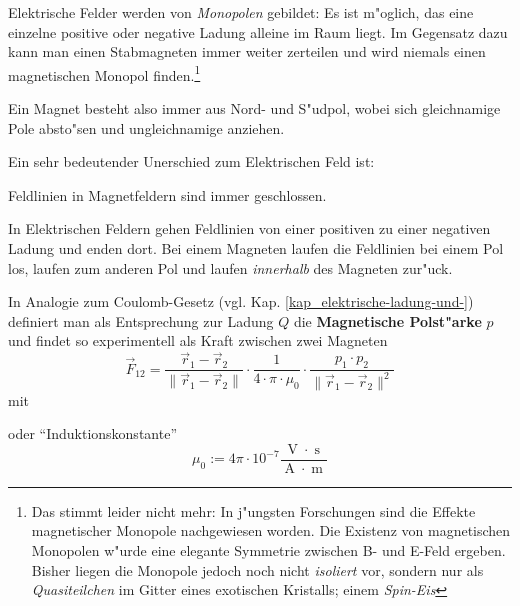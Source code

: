 Elektrische Felder werden von \emph{Monopolen} gebildet: Es ist
m"oglich, das eine einzelne positive oder negative Ladung alleine im
Raum liegt. Im Gegensatz dazu kann man einen Stabmagneten immer weiter
zerteilen und wird niemals einen magnetischen Monopol finden.\footnote{Das stimmt leider
  nicht mehr: In j"ungsten Forschungen sind die Effekte magnetischer
  Monopole nachgewiesen worden. Die Existenz von magnetischen
  Monopolen w"urde eine elegante Symmetrie zwischen B- und E-Feld
  ergeben. Bisher liegen die Monopole jedoch noch nicht
  \emph{isoliert} vor, sondern nur als \emph{Quasiteilchen} im Gitter
  eines exotischen Kristalls; einem \emph{Spin-Eis}}
\begin{Wichtig}
   Ein Magnet besteht also immer aus Nord- und S"udpol, wobei sich
   gleichnamige Pole absto"sen und ungleichnamige anziehen.
\end{Wichtig}

Ein sehr bedeutender Unerschied zum Elektrischen Feld ist:
\begin{Wichtig}
   Feldlinien in Magnetfeldern sind immer geschlossen.
\end{Wichtig}
In Elektrischen Feldern gehen Feldlinien von einer positiven zu einer
negativen Ladung und enden dort. Bei einem Magneten laufen die
Feldlinien bei einem Pol los, laufen zum anderen Pol und laufen
\emph{innerhalb} des Magneten zur"uck.

\bigskip

In Analogie
zum Coulomb-Gesetz (vgl. Kap. \ref{kap_elektrische-ladung-und-})
definiert man als Entsprechung zur Ladung $Q$ die
\textbf{Magnetische Polst"arke} $p$ und
findet so experimentell als Kraft zwischen zwei Magneten
\begin{equation}
   \label{eqn_differenz-c88}
   \vec F_{12} = \frac{\vec r_1  - \vec r_2}{\|\vec r_1 - \vec r_2\|} \cdot
   \frac{1}{4 \cdot \pi \cdot \mu_0} \cdot \frac{p_1 \cdot p_2}{\|\vec
   r_1 - \vec r_2\|^2}
\end{equation}
mit
\begin{Def}
    oder "`Induktionskonstante"'
   \begin{equation}
      \label{eqn_differenz-c89}
      \mu_0 := 4\pi \cdot 10^{-7} \frac{\operatorname{V} \cdot \operatorname{s}}{\operatorname{A}\cdot\operatorname{m}}
   \end{equation}
\end{Def}

